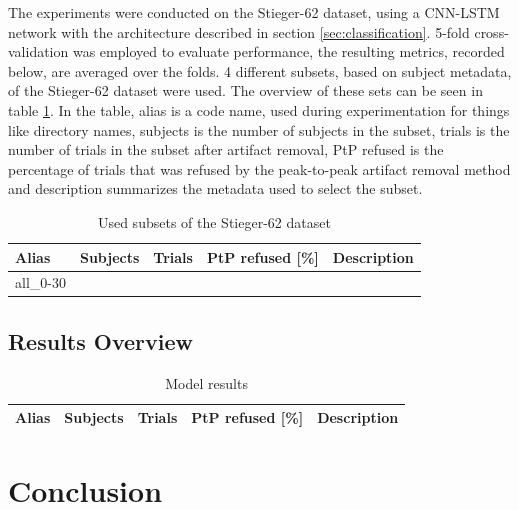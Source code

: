 \documentclass[english, he, bc, kiv, iso690alph]{fasthesis}
\begin{document}

The experiments were conducted on the Stieger-62 dataset, using a CNN-LSTM network with the architecture described in section \ref{sec:classification}. 5-fold cross-validation was employed to evaluate performance, the resulting metrics, recorded below, are averaged over the folds. 4 different subsets, based on subject metadata, of the Stieger-62 dataset were used. The overview of these sets can be seen in table \ref{tab:subsets}. In the table, alias is a code name, used during experimentation for things like directory names, subjects is the number of subjects in the subset, trials is the number of trials in the subset after artifact removal, PtP refused is the percentage of trials that was refused by the peak-to-peak artifact removal method and description summarizes the metadata used to select the subset.

\begin{table}
	\label{tab:subsets}
	\centering
	\caption{Used subsets of the Stieger-62 dataset}
	\begin{tabular}{*{5}{l}}
		\toprule
		\textbf{Alias} & \textbf{Subjects} & \textbf{Trials} & \textbf{PtP refused [\%]} & \textbf{Description} \\
		\midrule
		all_0-30\\

		\bottomrule
	\end{tabular}
\end{table}

\section{Results Overview}

\begin{table}
	\label{tab:results}
	\centering
	\caption[Model results]{Model results}
	\begin{tabular}{*{5}{l}}
		\toprule
		\textbf{Alias} & \textbf{Subjects} & \textbf{Trials} & \textbf{PtP refused [\%]} & \textbf{Description} \\
		\midrule
		\bottomrule
	\end{tabular}
\end{table}

\chapter{Conclusion}
\label{chap:conclusion}


\backmatter
\printbibliography
\listoffigures
\listoftables
\listoflistings

\setbackpageqrcode
\backpage
\end{document}
